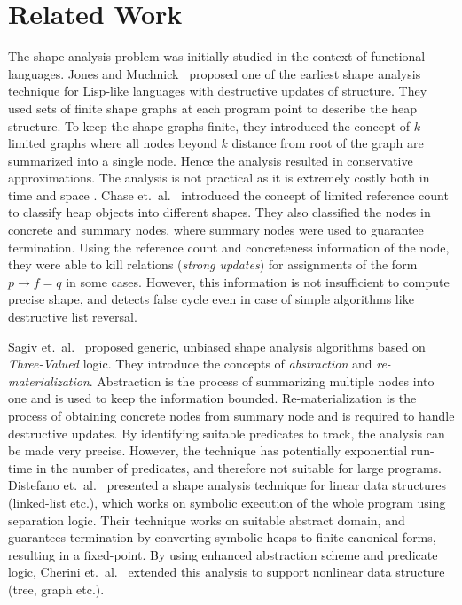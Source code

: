 \documentclass{sig-alternate}
\newcommand{\p}{\ensuremath{p}}
\newcommand{\q}{\ensuremath{q}}
\begin{document}
\section{Related Work}\label{sec:bgrel}

The shape-analysis problem was initially studied in the
context of functional languages. Jones and
Muchnick~\cite{Jones79} proposed one of the earliest shape
analysis technique for Lisp-like languages with destructive
updates of structure. They used sets of finite shape graphs
at each program point to describe the heap structure.  To
keep the shape graphs finite, they introduced the concept of
$k$-limited graphs where all nodes beyond $k$ distance from
root of the graph are summarized into a single node. Hence
the analysis resulted in conservative approximations. The
analysis is not practical as it is extremely costly both in
time and space .
%
Chase et.~al.~\cite{Chase90} introduced the concept of limited
reference count to classify heap objects into different
shapes. They also classified the nodes in concrete and
summary nodes, where summary nodes were used to guarantee
termination. Using the reference count and concreteness
information of the node, they were able to kill relations
({\em strong updates}) for assignments of the form $\p\rightarrow f = \q$
in some cases. However, this information is not
insufficient to compute precise shape, and detects false
cycle even in case of simple algorithms like destructive list
reversal.

Sagiv et.~al.~\cite{Sagiv96,Sagiv02toplas} proposed
generic, unbiased shape analysis algorithms based on {\em
  Three-Valued} logic. They introduce the concepts of {\em
  abstraction} and {\em re-materialization}. Abstraction is
the process of summarizing multiple nodes into one and is
used to keep the information bounded.  Re-materialization is
the process of obtaining concrete nodes from summary node and
is required to handle destructive updates. By identifying
suitable predicates to track, the analysis can be made very
precise.  However, the technique has potentially exponential
run-time in the number of predicates, and therefore not
suitable for large programs.
%
Distefano et.~al.~\cite{distefano06local} presented a shape
analysis technique for linear data structures (linked-list
etc.), which works on symbolic execution of the whole program
using separation logic. Their technique works on suitable
abstract domain, and guarantees termination by converting
symbolic heaps to finite canonical forms, resulting in a
fixed-point. By using enhanced abstraction scheme and
predicate logic, Cherini et.~al.~\cite{cherini10shape}
extended this analysis to support nonlinear data structure
(tree, graph etc.).
\end{document}
